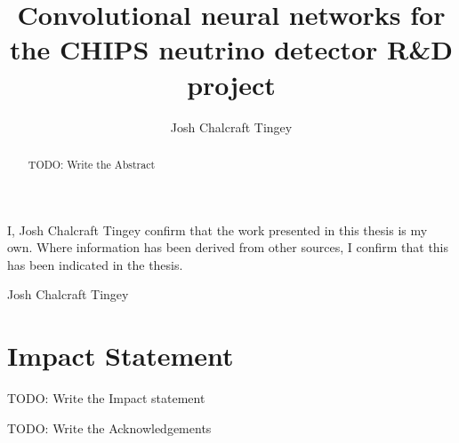 
\title{Convolutional neural networks for the CHIPS neutrino detector R\&D project}
\author{Josh Chalcraft Tingey}

\thispagestyle{plain}

\begin{declaration} %
    I, Josh Chalcraft Tingey confirm that the work presented in this thesis is my own. Where
    information has been derived from other sources, I confirm that this has been indicated in the
    thesis.
    \vspace*{1cm}
    \begin{flushright}
        Josh Chalcraft Tingey
    \end{flushright}
\end{declaration}

\begin{abstract} %
    TODO: Write the Abstract
\end{abstract}

\chapter*{\centering Impact Statement} %
TODO: Write the Impact statement

\begin{acknowledgements} %
    TODO: Write the Acknowledgements
\end{acknowledgements}

\tableofcontents %
